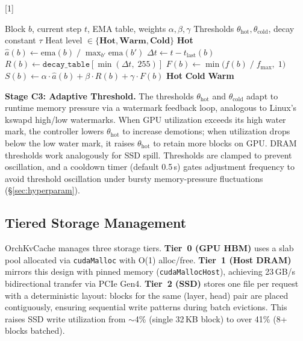 \documentclass[conference]{IEEEtran}
\begin{document}
\begin{algorithm}[t]
\caption{Per-Block Hot-Cold Classification (C1+C2)}
\label{alg:classify}
\algrenewcommand{\alglinenumber}[1]{}
\begin{algorithmic}
\Require Block $b$, current step $t$, EMA table, weights $\alpha, \beta, \gamma$
\Require Thresholds $\theta_{\text{hot}}, \theta_{\text{cold}}$, decay constant $\tau$
\Ensure Heat level $\in \{\textbf{Hot}, \textbf{Warm}, \textbf{Cold}\}$
\Statex
{} 
    \State \Return \textbf{Hot}
\EndIf
\Statex
\State $\hat{a}(b) \gets \text{ema}(b) \;/\; \max_{b'} \text{ema}(b')$ 
\State $\Delta t \gets t - t_{\text{last}}(b)$ 
\State $R(b) \gets \texttt{decay\_table}[\min(\Delta t,\; 255)]$ 
\State $F(b) \gets \min\bigl(f(b) \;/\; f_{\max},\; 1\bigr)$ 
\Statex
\State $S(b) \gets \alpha \cdot \hat{a}(b) + \beta \cdot R(b) + \gamma \cdot F(b)$ 
\Statex
{}
    \State \Return \textbf{Hot} 
    \State \Return \textbf{Cold} 
\Else
    \State \Return \textbf{Warm} 
\EndIf
\end{algorithmic}
\end{algorithm}

\textbf{Stage C3: Adaptive Threshold.} The thresholds $\theta_{\text{hot}}$ and $\theta_{\text{cold}}$ adapt to runtime memory pressure via a watermark feedback loop, analogous to Linux's kswapd high/low watermarks. When GPU utilization exceeds its high water mark, the controller lowers $\theta_{\text{hot}}$ to increase demotions; when utilization drops below the low water mark, it raises $\theta_{\text{hot}}$ to retain more blocks on GPU. DRAM thresholds work analogously for SSD spill. Thresholds are clamped to prevent oscillation, and a cooldown timer (default 0.5\,s) gates adjustment frequency to avoid threshold oscillation under bursty memory-pressure fluctuations (\S\ref{sec:hyperparam}).

\subsection{Tiered Storage Management}
\label{sec:tiered-storage}

OrchKvCache manages three storage tiers.
\textbf{Tier~0 (GPU HBM)} uses a slab pool allocated via \texttt{cudaMalloc} with O(1) alloc/free.
\textbf{Tier~1 (Host DRAM)} mirrors this design with pinned memory (\texttt{cudaMallocHost}), achieving 23\,GB/s bidirectional transfer via PCIe Gen4.
\textbf{Tier~2 (SSD)} stores one file per request with a deterministic layout: blocks for the same (layer, head) pair are placed contiguously, ensuring sequential write patterns during batch evictions. This raises SSD write utilization from ${\sim}$4\% (single 32\,KB block) to over 41\% (8+ blocks batched).
\end{document}
